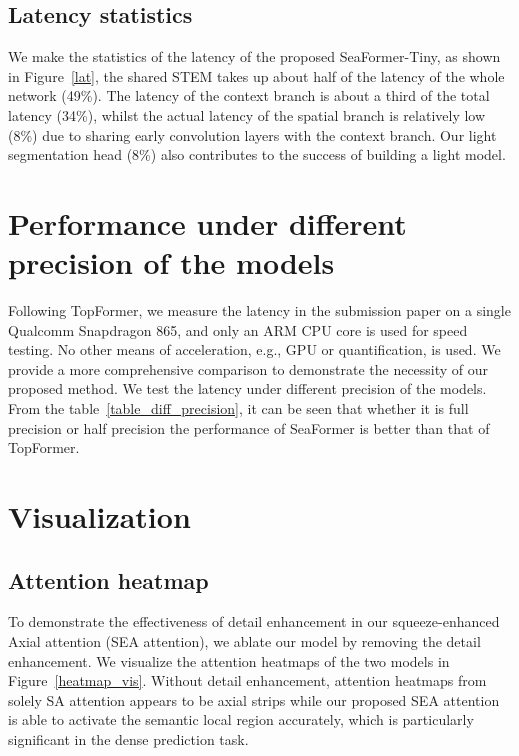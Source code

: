 

\subsection{Latency statistics}

We make the statistics of the latency of the proposed SeaFormer-Tiny, as shown in Figure~\ref{lat}, the shared STEM takes up about half of the latency of the whole network (49\%). 
The latency of the context branch is about a third of the total latency (34\%), 
whilst the actual latency of the spatial branch is relatively low (8\%) due to sharing early convolution layers with the context branch.
Our light segmentation head (8\%) also contributes to the success of building a light model.

\section{Performance under different precision of the models}
Following TopFormer, we measure the latency in the submission paper on a single Qualcomm Snapdragon 865, and only an ARM CPU core is used for speed testing. No other means of acceleration, e.g., GPU or quantification, is used. We provide a more comprehensive comparison to demonstrate the necessity of our proposed method. We test the latency under different precision of the models.
From the table~\ref{table_diff_precision}, it can be seen that whether it is full precision or half precision the performance of SeaFormer is better than that of TopFormer.


\section{Visualization}

\subsection{Attention heatmap}
To demonstrate the effectiveness of detail enhancement in our squeeze-enhanced Axial attention (SEA attention),
we ablate our model by removing the detail enhancement. 
We visualize the attention heatmaps of the two models in Figure~\ref{heatmap_vis}.
Without detail enhancement, attention heatmaps from solely SA attention appears to be axial strips while our proposed SEA attention is able to activate the semantic local region accurately, which is particularly significant in the dense prediction task.

